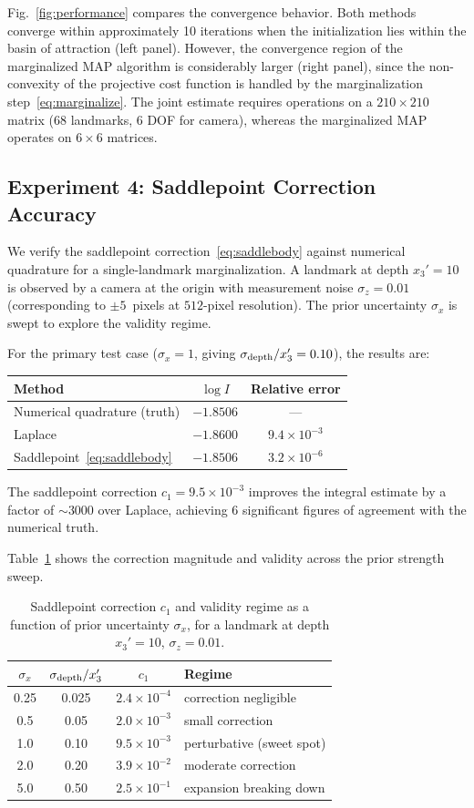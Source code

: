 \documentclass[journal]{IEEEtran}
\begin{document}
Fig.~\ref{fig:performance} compares the convergence behavior.
Both methods converge within approximately 10 iterations when 
the initialization lies within the basin of attraction (left panel).
However, the convergence region of the marginalized MAP algorithm 
is considerably larger (right panel), since the non-convexity 
of the projective cost function is handled by the 
marginalization step~\eqref{eq:marginalize}. The joint estimate 
requires operations on a $210 \times 210$ matrix (68 landmarks, 
6 DOF for camera), whereas the marginalized MAP operates on 
$6 \times 6$ matrices.

\subsection{Experiment 4: Saddlepoint Correction Accuracy}

We verify the saddlepoint correction~\eqref{eq:saddlebody}
against numerical quadrature for a single-landmark
marginalization. A landmark at depth $x_3' = 10$ is observed
by a camera at the origin with measurement noise
$\sigma_z = 0.01$ (corresponding to $\pm 5$~pixels at 
$512$-pixel resolution). The prior uncertainty $\sigma_x$
is swept to explore the validity regime.

For the primary test case ($\sigma_x = 1$, giving
$\sigma_{\rm depth}/x_3' = 0.10$), the results are:
\begin{center}
\begin{tabular}{l|c|c}
Method & $\log I$ & Relative error \\
\hline
Numerical quadrature (truth) & $-1.8506$ & --- \\
Laplace & $-1.8600$ & $9.4 \times 10^{-3}$ \\
Saddlepoint~\eqref{eq:saddlebody} & $-1.8506$ & $3.2 \times 10^{-6}$
\end{tabular}
\end{center}
The saddlepoint correction $c_1 = 9.5 \times 10^{-3}$
improves the integral estimate by a factor of $\sim\! 3000$
over Laplace, achieving 6 significant figures of agreement
with the numerical truth.

Table~\ref{tab:spregime} shows the correction magnitude
and validity across the prior strength sweep.
\begin{table}[t]
\centering
\caption{Saddlepoint correction $c_1$ and validity regime
as a function of prior uncertainty $\sigma_x$,
for a landmark at depth $x_3' = 10$, $\sigma_z = 0.01$.}
\label{tab:spregime}
\begin{tabular}{c|c|c|l}
$\sigma_x$ & $\sigma_{\rm depth}/x_3'$ & $c_1$ & Regime \\
\hline
0.25 & 0.025  & $2.4\times10^{-4}$ & correction negligible \\
0.5  & 0.05   & $2.0\times10^{-3}$ & small correction \\
1.0  & 0.10   & $9.5\times10^{-3}$ & perturbative (sweet spot) \\
2.0  & 0.20   & $3.9\times10^{-2}$ & moderate correction \\
5.0  & 0.50   & $2.5\times10^{-1}$ & expansion breaking down
\end{tabular}
\end{table}
\end{document}

